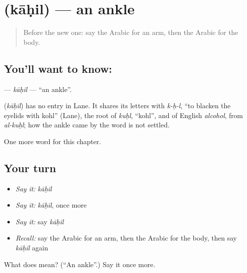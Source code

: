 \section[\texorpdfstring{\ar{كاحل} (kāḥil)}{كاحل (kāḥil)}]{ (kāḥil) — an ankle}

\label{lesson:AR-C168-kahil}



\begin{quote}
Before the new one: say the Arabic for an arm, then the Arabic for the body.
\end{quote}

\subsection*{You'll want to know: }
\textbf{} — \emph{kāḥil} — \textquotedblleft{}an ankle\textquotedblright{}.

\begin{cousinweb}
\textbf{} (\emph{kāḥil}) has no entry in Lane. It shares its letters with \emph{k-ḥ-l}, \textquotedblleft{}to blacken the eyelids with kohl\textquotedblright{} (Lane), the root of \emph{kuḥl}, \textquotedblleft{}kohl\textquotedblright{}, and of English \emph{alcohol}, from \emph{al-kuḥl}; how the ankle came by the word is not settled.
\end{cousinweb}

\begin{grammarlens}[title={What you've built}]
One more word for this chapter.
\end{grammarlens}

\subsection*{Your turn}
\begin{itemize}
\raggedright
  \item \emph{Say it:} \emph{kāḥil}
  \item \emph{Say it:} \emph{kāḥil}, once more
  \item \emph{Say it:} say \emph{kāḥil}
  \item \emph{Recall:} say the Arabic for an arm, then the Arabic for the body, then say \emph{kāḥil} again
\end{itemize}

\begin{tcolorbox}[breakable,colback=teal!4,colframe=teal!35!black,title={Before you move on}]
What does  mean? (\textquotedblleft{}An ankle\textquotedblright{}.) Say it once more.
\end{tcolorbox}
